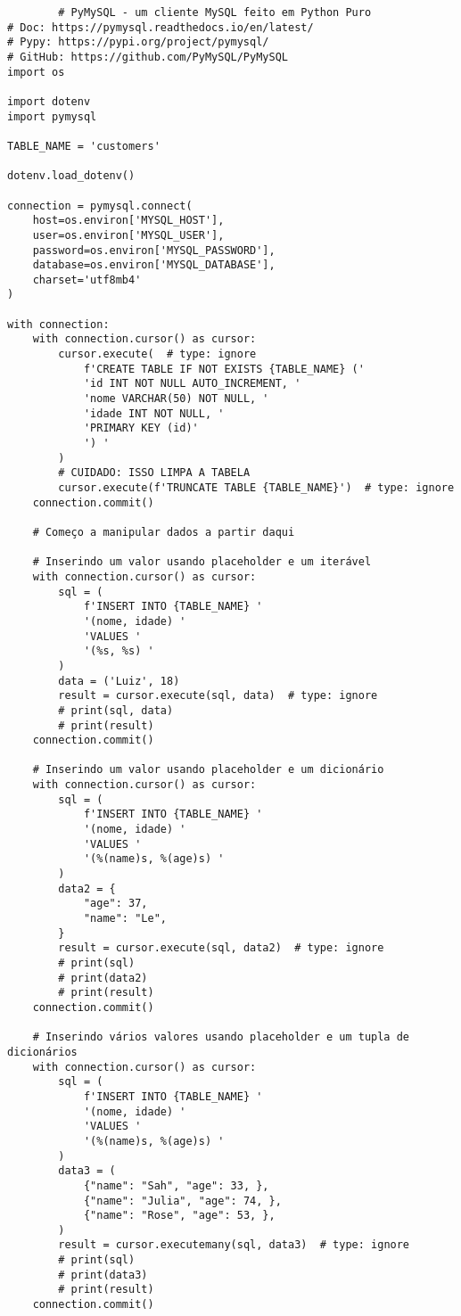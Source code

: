 \documentclass{article}
\begin{document}
    \begin{lstlisting}
        # PyMySQL - um cliente MySQL feito em Python Puro
# Doc: https://pymysql.readthedocs.io/en/latest/
# Pypy: https://pypi.org/project/pymysql/
# GitHub: https://github.com/PyMySQL/PyMySQL
import os

import dotenv
import pymysql

TABLE_NAME = 'customers'

dotenv.load_dotenv()

connection = pymysql.connect(
    host=os.environ['MYSQL_HOST'],
    user=os.environ['MYSQL_USER'],
    password=os.environ['MYSQL_PASSWORD'],
    database=os.environ['MYSQL_DATABASE'],
    charset='utf8mb4'
)

with connection:
    with connection.cursor() as cursor:
        cursor.execute(  # type: ignore
            f'CREATE TABLE IF NOT EXISTS {TABLE_NAME} ('
            'id INT NOT NULL AUTO_INCREMENT, '
            'nome VARCHAR(50) NOT NULL, '
            'idade INT NOT NULL, '
            'PRIMARY KEY (id)'
            ') '
        )
        # CUIDADO: ISSO LIMPA A TABELA
        cursor.execute(f'TRUNCATE TABLE {TABLE_NAME}')  # type: ignore
    connection.commit()

    # Começo a manipular dados a partir daqui

    # Inserindo um valor usando placeholder e um iterável
    with connection.cursor() as cursor:
        sql = (
            f'INSERT INTO {TABLE_NAME} '
            '(nome, idade) '
            'VALUES '
            '(%s, %s) '
        )
        data = ('Luiz', 18)
        result = cursor.execute(sql, data)  # type: ignore
        # print(sql, data)
        # print(result)
    connection.commit()

    # Inserindo um valor usando placeholder e um dicionário
    with connection.cursor() as cursor:
        sql = (
            f'INSERT INTO {TABLE_NAME} '
            '(nome, idade) '
            'VALUES '
            '(%(name)s, %(age)s) '
        )
        data2 = {
            "age": 37,
            "name": "Le",
        }
        result = cursor.execute(sql, data2)  # type: ignore
        # print(sql)
        # print(data2)
        # print(result)
    connection.commit()

    # Inserindo vários valores usando placeholder e um tupla de dicionários
    with connection.cursor() as cursor:
        sql = (
            f'INSERT INTO {TABLE_NAME} '
            '(nome, idade) '
            'VALUES '
            '(%(name)s, %(age)s) '
        )
        data3 = (
            {"name": "Sah", "age": 33, },
            {"name": "Julia", "age": 74, },
            {"name": "Rose", "age": 53, },
        )
        result = cursor.executemany(sql, data3)  # type: ignore
        # print(sql)
        # print(data3)
        # print(result)
    connection.commit()


\end{lstlisting}
\end{document}
